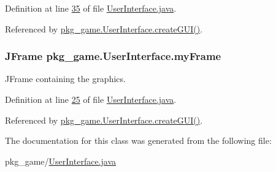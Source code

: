 Definition at line \hyperlink{UserInterface_8java_source_l00035}{35} of file \hyperlink{UserInterface_8java_source}{User\-Interface.\-java}.



Referenced by \hyperlink{UserInterface_8java_source_l00123}{pkg\-\_\-game.\-User\-Interface.\-create\-G\-U\-I()}.

\hypertarget{classpkg__game_1_1UserInterface_a482eeb80a47dd8c4148af0ea648a8b49}{
\subsubsection[{my\-Frame}]{\setlength{\rightskip}{0pt plus 5cm}J\-Frame pkg\-\_\-game.\-User\-Interface.\-my\-Frame\hspace{0.3cm}{\ttfamily [private]}}}\label{classpkg__game_1_1UserInterface_a482eeb80a47dd8c4148af0ea648a8b49}


J\-Frame containing the graphics. 



Definition at line \hyperlink{UserInterface_8java_source_l00025}{25} of file \hyperlink{UserInterface_8java_source}{User\-Interface.\-java}.



Referenced by \hyperlink{UserInterface_8java_source_l00123}{pkg\-\_\-game.\-User\-Interface.\-create\-G\-U\-I()}.



The documentation for this class was generated from the following file\-:\begin{DoxyCompactItemize}
\item 
pkg\-\_\-game/\hyperlink{UserInterface_8java}{User\-Interface.\-java}\end{DoxyCompactItemize}
